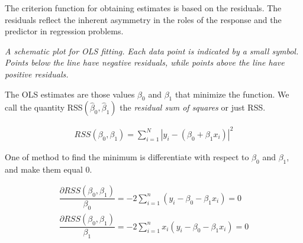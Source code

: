 \documentclass{article}
\begin{document}
    The criterion function for obtaining estimates is based on the residuals. The residuals reflect the inherent asymmetry in the roles of the response and the predictor in regression problems.
    
    \begin{center}
        \pgfplotsset{compat=newest}
        
        \textit{A schematic plot for OLS fitting. Each data point is indicated by a small symbol. Points below the line have negative residuals, while points above the line have positive residuals.}
    \end{center}
    
    The OLS estimates are those values ${\beta_{0}}$ and ${\beta_{1}}$ that minimize the function. We call the quantity RSS${ \left (\hat{\beta}_{0},{\hat{\beta}_{1}} \right)}$ the \textit{residual sum of squares} or just RSS.
    
    \begin{align}
        RSS(\beta_{0}, \beta_{1}) = \displaystyle \sum _{i = 1} ^ {N}   |y_{i} - (\beta_{0} + \beta_{1} x_{i})| ^ 2
     \end{align}
    
    One of method to find the minimum is differentiate with respect to $\beta_{0}$ and $\beta_{1}$, and make them equal $0$. 
     
    \begin{align} 
        \dfrac{\partial RSS(\beta_{0}, \beta_{1}) }{\beta_{0}} = -2 \displaystyle \sum _{i=1}^{n}  (y_{i} - \beta_{0} - \beta_{1} x_{i}) = 0
        \\
        \dfrac{\partial RSS(\beta_{0}, \beta_{1}) }{\beta_{1}} = -2 \displaystyle \sum _{i=1}^{n}  x_{i} (y_{i} - \beta_{0} - \beta_{1} x_{i}) = 0
    \end{align}
        
\end{document}
